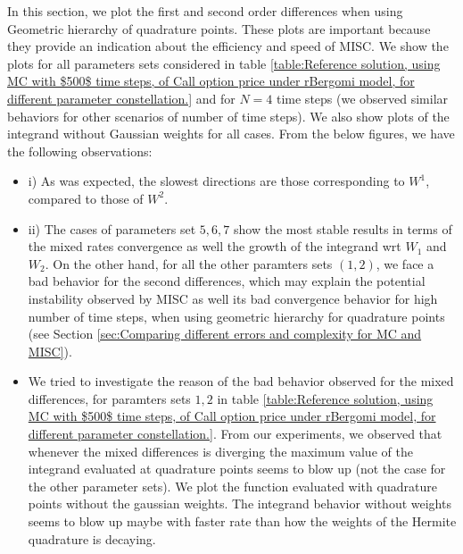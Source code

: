 \documentclass[11pt]{article}
\begin{document}
In this section, we plot the first and second order differences when using Geometric hierarchy of quadrature points. These plots are important because they provide an indication about the efficiency and speed of MISC. We show the plots for all parameters sets considered in table \ref{table:Reference solution, using MC with $500$ time steps, of Call option price under rBergomi model, for different parameter constellation.}  and for  $N=4$ time steps (we observed similar behaviors for other scenarios of number of time steps). We also show plots of the integrand without Gaussian weights for all cases.  From the below figures, we have the following observations:
\begin{itemize}
	\item i) As was expected, the slowest directions are those corresponding to $W^1$, compared to those of   $W^2$.
	
	\item ii) The cases of parameters set $5,6,7$ show the most stable results in terms of the mixed rates convergence as well the growth of the integrand wrt $W_1$ and $W_2$. On the other hand, for all the other paramters sets $(1,2)$, we face a bad behavior for the second differences,  which may explain the potential instability observed by MISC as well its bad convergence behavior for high number of time steps, when using geometric hierarchy for quadrature points (see Section \ref{sec:Comparing different  errors and complexity for MC and MISC}). 
	\item We tried to investigate the reason of the bad behavior observed for the mixed differences, for paramters sets $1,2$ in table \ref{table:Reference solution, using MC with $500$ time steps, of Call option price under rBergomi model, for different parameter constellation.}. From our experiments, we observed that whenever the mixed differences is diverging the maximum value of the integrand evaluated at quadrature points seems to blow up (not the case for the other parameter sets). We plot   the function evaluated with quadrature points without the gaussian weights. The integrand behavior without weights seems to blow up maybe with faster rate than how the weights of the Hermite quadrature is decaying.
\end{itemize}
\end{document}

